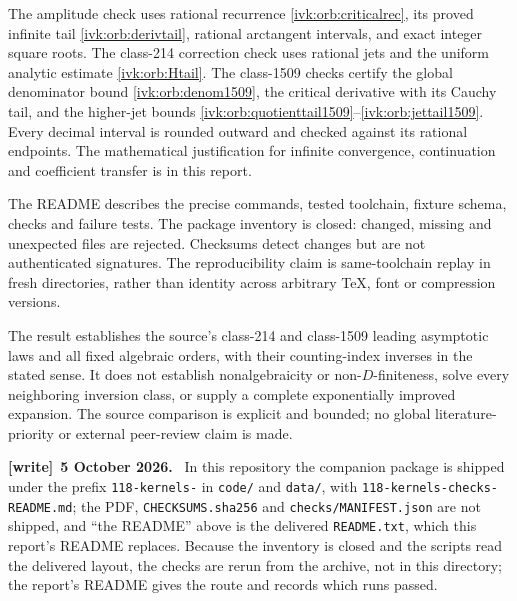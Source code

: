 \documentclass[11pt,letterpaper]{article}
\theoremstyle{remark}\newtheorem{remark}[theorem]{Remark}
\newcommand{\file}[1]{\nolinkurl{#1}}
\newenvironment{writenote}[1][]{\par\smallskip\begingroup\small
 \noindent\textbf{[write]}\if\relax\detokenize{#1}\relax\else~\textbf{#1.}\fi\ }%
 {\par\endgroup\smallskip}
\begin{document}
The amplitude check uses rational recurrence \eqref{ivk:orb:criticalrec}, its
proved infinite tail \eqref{ivk:orb:derivtail}, rational arctangent intervals,
and exact integer square roots. The class-214 correction check uses rational
jets and the uniform analytic estimate \eqref{ivk:orb:Htail}. The class-1509
checks certify the global denominator bound \eqref{ivk:orb:denom1509},
the critical derivative with its Cauchy tail, and the higher-jet
bounds \eqref{ivk:orb:quotienttail1509}--\eqref{ivk:orb:jettail1509}. Every decimal
interval is rounded outward and checked against its rational
endpoints. The mathematical justification for infinite convergence,
continuation and coefficient transfer is in this report.

The README describes the precise commands, tested toolchain, fixture
schema, checks and failure tests. The package inventory is closed:
changed, missing and unexpected files are rejected. Checksums detect
changes but are not authenticated signatures. The reproducibility
claim is same-toolchain replay in fresh directories, rather than
identity across arbitrary TeX, font or compression versions.

The result establishes the source's class-214 and class-1509 leading
asymptotic laws and all fixed algebraic orders, with their counting-index
inverses in the
stated sense. It does not establish nonalgebraicity or non-$D$-finiteness,
solve every neighboring inversion class, or supply a complete
exponentially improved expansion. The source comparison is explicit
and bounded; no global literature-priority or external peer-review
claim is made.

\begin{writenote}[5 October 2026]
In this repository the companion package is shipped under the prefix \file{118-kernels-} in \file{code/} and \file{data/}, with \file{118-kernels-checks-README.md}; the PDF, \file{CHECKSUMS.sha256} and \file{checks/MANIFEST.json} are not shipped, and ``the README'' above is the delivered \file{README.txt}, which this report's README replaces. Because the inventory is closed and the scripts read the delivered layout, the checks are rerun from the archive, not in this directory; the report's README gives the route and records which runs passed.
\end{writenote}
\end{document}
